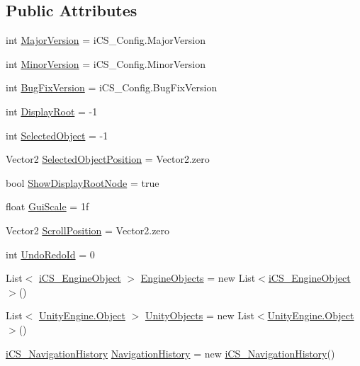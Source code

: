 \subsection*{Public Attributes}
\begin{DoxyCompactItemize}
\item 
int \hyperlink{classi_c_s___visual_script_data_a0f5027231abdf8acfde9b7a817d63d9e}{Major\+Version} = i\+C\+S\+\_\+\+Config.\+Major\+Version
\item 
int \hyperlink{classi_c_s___visual_script_data_aed4c8e59293c7741798428d1347d6d9c}{Minor\+Version} = i\+C\+S\+\_\+\+Config.\+Minor\+Version
\item 
int \hyperlink{classi_c_s___visual_script_data_ab44363b835e38ff3935b6741b76f8848}{Bug\+Fix\+Version} = i\+C\+S\+\_\+\+Config.\+Bug\+Fix\+Version
\item 
int \hyperlink{classi_c_s___visual_script_data_a3e2dbb7f40f92c174114866ab3586160}{Display\+Root} = -\/1
\item 
int \hyperlink{classi_c_s___visual_script_data_ad3d3683654dbc05409deed3cc02d5d37}{Selected\+Object} = -\/1
\item 
Vector2 \hyperlink{classi_c_s___visual_script_data_a9456f565061fbc8ca3b0536fd3d61ff8}{Selected\+Object\+Position} = Vector2.\+zero
\item 
bool \hyperlink{classi_c_s___visual_script_data_a8fd89a2ccaae83d08f3c8a43e8d1bef3}{Show\+Display\+Root\+Node} = true
\item 
float \hyperlink{classi_c_s___visual_script_data_a8ee236852552ec82eb8bc99ad009017d}{Gui\+Scale} = 1f
\item 
Vector2 \hyperlink{classi_c_s___visual_script_data_ae9ef65cbefa1d2a799808fde0fc89b5b}{Scroll\+Position} = Vector2.\+zero
\item 
int \hyperlink{classi_c_s___visual_script_data_ac8708ce46b6345280e92f527d736e70d}{Undo\+Redo\+Id} = 0
\item 
List$<$ \hyperlink{classi_c_s___engine_object}{i\+C\+S\+\_\+\+Engine\+Object} $>$ \hyperlink{classi_c_s___visual_script_data_a7b6508437f306912bfb94c51b066e67c}{Engine\+Objects} = new List$<$\hyperlink{classi_c_s___engine_object}{i\+C\+S\+\_\+\+Engine\+Object}$>$()
\item 
List$<$ \hyperlink{i_c_s___logic_8cs_a5b2c8b05b9a357906d7f9e5b2c1e154d}{Unity\+Engine.\+Object} $>$ \hyperlink{classi_c_s___visual_script_data_a95c027c642cf5b55252ff0436727ca37}{Unity\+Objects} = new List$<$\hyperlink{i_c_s___logic_8cs_a5b2c8b05b9a357906d7f9e5b2c1e154d}{Unity\+Engine.\+Object}$>$()
\item 
\hyperlink{classi_c_s___navigation_history}{i\+C\+S\+\_\+\+Navigation\+History} \hyperlink{classi_c_s___visual_script_data_aeca6827cf83bcb04b2ae5761fb4ad9b9}{Navigation\+History} = new \hyperlink{classi_c_s___navigation_history}{i\+C\+S\+\_\+\+Navigation\+History}()
\end{DoxyCompactItemize}
